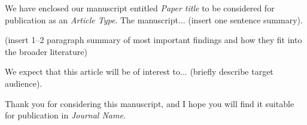\documentclass[11pt,stdletter,orderfromtodate,sigleft]{newlfm}
\newcommand{\journal}{Journal Name}
\newcommand{\articletype}{Article Type}
\renewcommand{\title}{Paper title}
\begin{document}
\begin{newlfm}
  We have enclosed our manuscript entitled \textit{\title} to be
  considered for publication as an \textit{\articletype}.  The
  manuscript... (insert one sentence summary).

(insert 1--2 paragraph summary of most important findings and how they
fit into the broader literature)

We expect that this article will be of interest to... (briefly describe target audience).

Thank you for considering this manuscript, and I hope you will find it suitable for publication in \textit{\journal}.


\end{newlfm}
\end{document}
